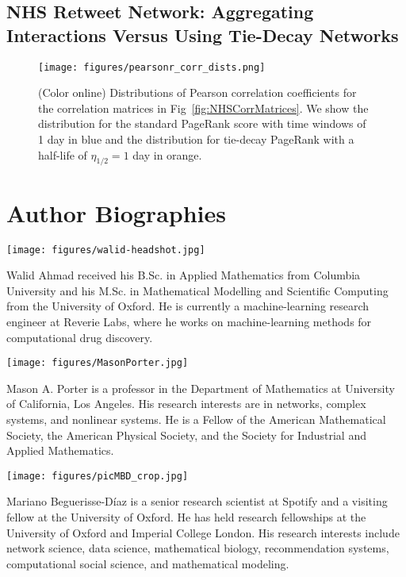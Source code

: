 \documentclass[journal,transmag]{IEEEtran}
\begin{document}

\subsection{NHS Retweet Network: Aggregating Interactions Versus Using Tie-Decay Networks}
\label{sec:appAggvDecay}


\begin{figure}[htp]
  \centering
  \texttt{[image: figures/pearsonr\_corr\_dists.png]}
  \caption{(Color online) 
  Distributions of Pearson correlation coefficients for the correlation matrices in Fig~\ref{fig:NHSCorrMatrices}. We show the distribution for the standard PageRank score with time windows of 1 day in blue and the distribution for tie-decay PageRank with a half-life of $\eta_{1/2} = 1$ day in orange.
  }
  \label{fig:NHSCorrMatDists}
\end{figure}


\pagebreak


\section*{Author Biographies}

\begin{center}
\texttt{[image: figures/walid-headshot.jpg]}
\end{center}
Walid Ahmad received his B.Sc. in Applied Mathematics from Columbia University
and his M.Sc. in Mathematical Modelling and Scientific Computing from the
University of Oxford. He is currently a machine-learning research engineer
at Reverie Labs, where he works on machine-learning methods for 
computational drug discovery.\\

\begin{center}
\texttt{[image: figures/MasonPorter.jpg]}
\end{center}
Mason A. Porter is a professor in the Department of Mathematics at University of
California, Los Angeles. His research interests are in networks,
complex systems, and nonlinear systems. He is a Fellow of the American
Mathematical Society, the American Physical Society, and the Society
for Industrial and Applied Mathematics.\\

\begin{center}
\texttt{[image: figures/picMBD\_crop.jpg]}\\
\end{center}
Mariano Beguerisse-D\'iaz is a senior research scientist at Spotify and a visiting
fellow at the University of Oxford. He has held research fellowships
at the University of Oxford and Imperial College London. His research
interests include network science, data science, mathematical biology,
recommendation systems, computational social science, and mathematical
modeling.
 
\end{document}
